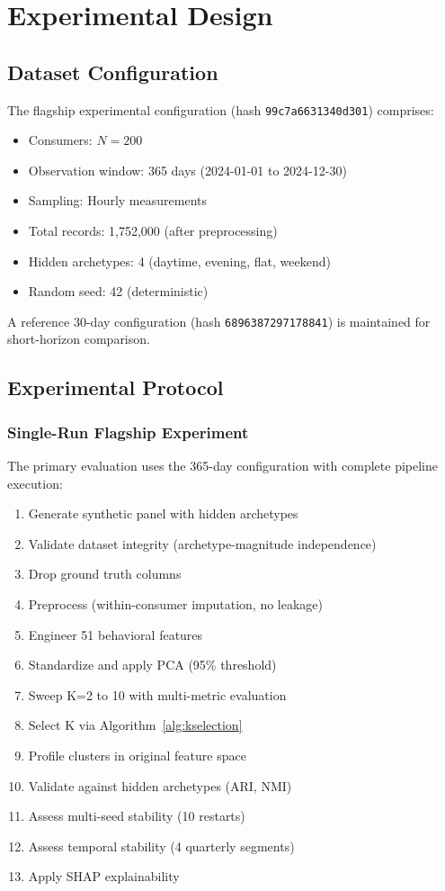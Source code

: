 \section{Experimental Design}
\label{sec:experiments}

\subsection{Dataset Configuration}

The flagship experimental configuration (hash \texttt{99c7a6631340d301}) comprises:
\begin{itemize}
    \item Consumers: $N = 200$
    \item Observation window: 365 days (2024-01-01 to 2024-12-30)
    \item Sampling: Hourly measurements
    \item Total records: 1,752,000 (after preprocessing)
    \item Hidden archetypes: 4 (daytime, evening, flat, weekend)
    \item Random seed: 42 (deterministic)
\end{itemize}

A reference 30-day configuration (hash \texttt{6896387297178841}) is maintained for short-horizon comparison.

\subsection{Experimental Protocol}

\subsubsection{Single-Run Flagship Experiment}

The primary evaluation uses the 365-day configuration with complete pipeline execution:
\begin{enumerate}
    \item Generate synthetic panel with hidden archetypes
    \item Validate dataset integrity (archetype-magnitude independence)
    \item Drop ground truth columns
    \item Preprocess (within-consumer imputation, no leakage)
    \item Engineer 51 behavioral features
    \item Standardize and apply PCA (95\% threshold)
    \item Sweep K=2 to 10 with multi-metric evaluation
    \item Select K via Algorithm~\ref{alg:kselection}
    \item Profile clusters in original feature space
    \item Validate against hidden archetypes (ARI, NMI)
    \item Assess multi-seed stability (10 restarts)
    \item Assess temporal stability (4 quarterly segments)
    \item Apply SHAP explainability
\end{enumerate}

